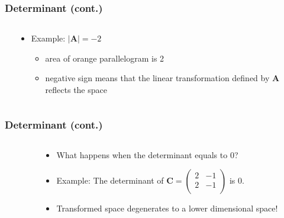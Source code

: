 \documentclass[pdflatex, 12pt]{beamer}
\begin{document}
\begin{frame}
\frametitle{Determinant (cont.)}
\begin{columns}
\begin{column}{0.5\textwidth}
\centering
{}
\end{column}
\begin{column}{0.5\textwidth}
\begin{itemize}
\item Example: $|\bm{A}| = -2$
 \begin{itemize}
 \item area of orange parallelogram is 2
 \item negative sign means that the linear transformation defined by $\bm{A}$ reflects the space
 \end{itemize}
\end{itemize}
\end{column}
\end{columns}
\end{frame}

\begin{frame}
\frametitle{Determinant (cont.)}
\begin{columns}
\begin{column}{0.5\textwidth}
\centering
{}
\end{column}
\begin{column}{0.5\textwidth}
\begin{itemize}
\item What happens when the determinant equals to 0?
\vspace{0.4cm}
\item Example: The determinant of $\bm{C} = \begin{pmatrix}
 2 & -1 \\
 2 & -1 \\
 \end{pmatrix}$ is 0.
\vspace{0.4cm}
\item Transformed space degenerates to a lower dimensional space!
\end{itemize}
\end{column}
\end{columns}
\end{frame}
\end{document}
